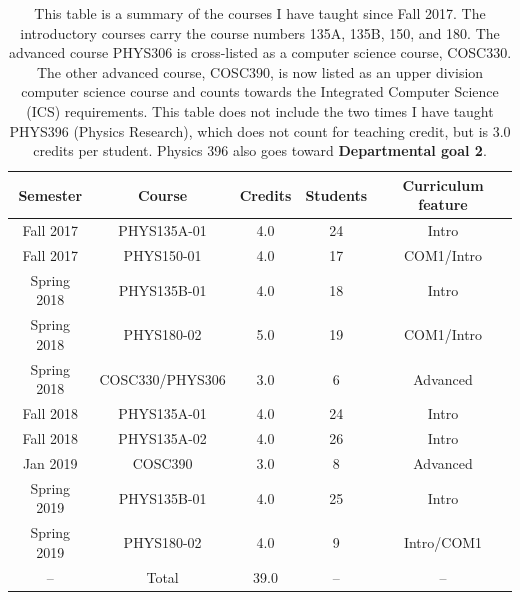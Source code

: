 \documentclass[../../../main.tex]{subfiles}
\begin{document}
\begin{table}
\centering
\begin{tabular}{| c | c | c | c | c |}
\hline \hline
Semester & Course & Credits & Students & Curriculum feature \\ \hline
Fall 2017 & PHYS135A-01 & 4.0 & 24 & Intro \\ \hline
Fall 2017 & PHYS150-01 & 4.0 & 17 & COM1/Intro \\ \hline
Spring 2018 & PHYS135B-01 & 4.0 & 18 & Intro \\ \hline
Spring 2018 & PHYS180-02 & 5.0 & 19 & COM1/Intro \\ \hline
Spring 2018 & COSC330/PHYS306 & 3.0 & 6 & Advanced \\ \hline
Fall 2018 & PHYS135A-01 & 4.0 & 24 & Intro \\ \hline
Fall 2018 & PHYS135A-02 & 4.0 & 26 & Intro \\ \hline
Jan 2019 & COSC390 & 3.0 & 8 & Advanced \\ \hline
Spring 2019 & PHYS135B-01 & 4.0 & 25 & Intro \\ \hline
Spring 2019 & PHYS180-02 & 4.0 & 9 & Intro/COM1 \\ \hline
-- & Total & 39.0 & -- & -- \\ \hline
\hline
\end{tabular}
\caption{\label{tab:courses:teaching} This table is a summary of the courses I have taught since Fall 2017.  The introductory courses carry the course numbers 135A, 135B, 150, and 180.  The advanced course PHYS306 is cross-listed as a computer science course, COSC330. The other advanced course, COSC390, is now listed as an upper division computer science course and counts towards the Integrated Computer Science (ICS) requirements.  This table does not include the two times I have taught PHYS396 (Physics Research), which does not count for teaching credit, but is 3.0 credits per student.  Physics 396 also goes toward \textbf{Departmental goal 2}.}
\end{table}
\end{document}
